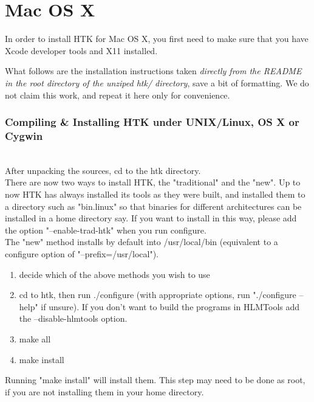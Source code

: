 \documentclass{wileySev}
\begin{document}
\section{Mac OS X}
In order to install HTK for Mac OS X, you first need to make sure that you have Xcode developer tools and X11 installed.

What follows are the installation instructions taken \textit{directly from the README in the root directory of the unziped htk/ directory}, save a bit of formatting. We do not claim this work, and repeat it here only for convenience.\\

\subsubsection{Compiling \& Installing HTK under UNIX/Linux, OS X or Cygwin}~\\

After unpacking the sources, cd to the htk directory.\\

There are now two ways to install HTK, the "traditional" and the
"new".  Up to now HTK has always installed its tools as they were
built, and installed them to a directory such as "bin.linux" so that
binaries for different architectures can be installed in a home
directory say.  If you want to install in this way, please add the
option "--enable-trad-htk" when you run configure.\\

The "new" method installs by default into /usr/local/bin (equivalent
to a configure option of "--prefix=/usr/local").\\

\begin{enumerate}
	\item decide which of the above methods you wish to use
	\item cd to htk, then run ./configure (with appropriate options, run "./configure --help" if unsure).
   If you don't want to build the programs in HLMTools add the
   --disable-hlmtools option.
	\item make all
	\item make install
\end{enumerate}

Running "make install" will install them.  This step may need to be
done as root, if you are not installing them in your home directory.\\
\end{document}
